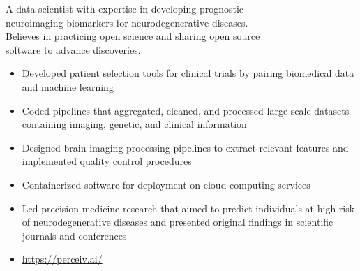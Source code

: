 \documentclass[10pt,a4paper,ragged2e,withhyper]{altacv}
\begin{document}

\makecvheader



\begin{paracol}{2}


A data scientist with expertise in developing prognostic \\ neuroimaging biomarkers for neurodegenerative diseases. \\ Believes in practicing open science and sharing open source \\ software to advance discoveries.
\smallskip



\begin{itemize}
    \item Developed patient selection tools for clinical trials by pairing biomedical data and machine learning
    \item Coded pipelines that aggregated, cleaned, and processed large-scale datasets containing imaging, genetic, and clinical information
    \item Designed brain imaging processing pipelines to extract relevant features and implemented quality control procedures
    \item Containerized software for deployment on cloud computing services
    \item Led precision medicine research that aimed to predict individuals at high-risk of neurodegenerative diseases and presented original findings in scientific journals and conferences
    \item \url{https://perceiv.ai/}
\end{itemize}


\end{paracol}
\end{document}
